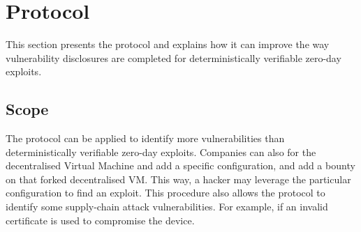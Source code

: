 \section{Protocol}
\label{sec:protocol}
This section presents the protocol and explains how it can improve the way vulnerability disclosures are completed for deterministically verifiable zero-day exploits.

\subsection{Scope}\label{subsec:scope}
The protocol can be applied to identify more vulnerabilities than deterministically verifiable zero-day exploits. Companies can also for the decentralised Virtual Machine and add a specific configuration, and add a bounty on that forked decentralised VM. This way, a hacker may leverage the particular configuration to find an exploit. This procedure also allows the protocol to identify some supply-chain attack vulnerabilities. For example, if an invalid certificate is used to compromise the device.

